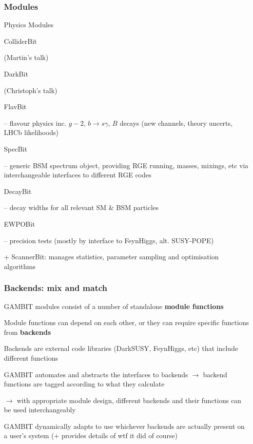 \documentclass[xcolor=dvipsnames]{beamer}
\newcommand{\corange}[1]{{\color[rgb]{0.9, 0.5, 0.0} #1}}
\begin{document}
\begin{frame}
\frametitle{Modules}

Physics Modules
\begin{itemize}
\corange{\item ColliderBit} (Martin's talk)
\corange{\item DarkBit} (Christoph's talk)
\corange{\item FlavBit} -- flavour physics inc. $g-2$, $b\rightarrow s\gamma$, $B$ decays (new channels, theory uncerts, LHCb likelihoods)
\corange{\item SpecBit} -- generic BSM spectrum object, providing RGE running, masses, mixings, etc via interchangeable interfaces to different RGE codes
\corange{\item DecayBit} -- decay widths for all relevant SM \& BSM particles
\corange{\item EWPOBit} -- precision tests (mostly by interface to FeynHiggs, alt. SUSY-POPE)
\end{itemize}

+\corange{ScannerBit}: manages statistics, parameter sampling and optimisation algorithms

\end{frame}


\begin{frame}
\frametitle{Backends: mix and match}

\bi
\item GAMBIT modules consist of a number of standalone \textbf{module functions}
\item Module functions can depend on each other, or they can require specific functions from \textbf{backends}
\item Backends are external code libraries (DarkSUSY, FeynHiggs, etc) that include different functions 
\item GAMBIT automates and abstracts the interfaces to backends $\rightarrow$ backend functions are tagged according to \alert{what they calculate}
\item $\rightarrow$ with appropriate module design, \alert{different backends and their functions can be used interchangeably}
\item GAMBIT dynamically adapts to use whichever backends are actually present on a user's system (+ provides details of wtf it did of course)
\ei


\end{frame}
\end{document}
